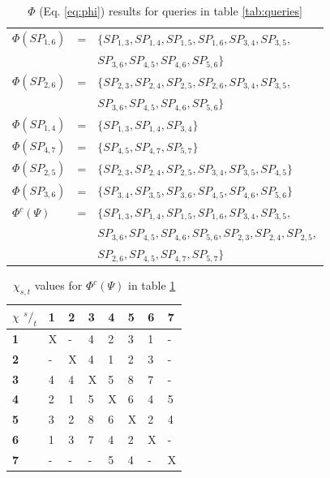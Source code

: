 \begin{table}
\begin{tabular}{lcp{}}
$\Phi(SP_{1,6})$ &= 	& $\{SP_{1,3},SP_{1,4},SP_{1,5},SP_{1,6},SP_{3,4},SP_{3,5},$\\
		 &	& $SP_{3,6},SP_{4,5},SP_{4,6},SP_{5,6}\}$ \\
$\Phi(SP_{2,6})$ &=  	& $\{SP_{2,3},SP_{2,4},SP_{2,5},SP_{2,6},SP_{3,4},SP_{3,5},$ \\
		 &	& $SP_{3,6},SP_{4,5},SP_{4,6},SP_{5,6}\}$ \\
$\Phi(SP_{1,4})$ &=  	& $\{SP_{1,3},SP_{1,4},SP_{3,4}\}$ \\
$\Phi(SP_{4,7})$ &=  	& $\{SP_{4,5},SP_{4,7},SP_{5,7}\}$ \\
$\Phi(SP_{2,5})$ &=  	& $\{SP_{2,3},SP_{2,4},SP_{2,5},SP_{3,4},SP_{3,5},SP_{4,5}\}$ \\
$\Phi(SP_{3,6})$ &=  	& $\{SP_{3,4},SP_{3,5},SP_{3,6},SP_{4,5},SP_{4,6},SP_{5,6}\}$ \\\hline
$\Phi^c(\Psi)$ 	 &=  	& $\{SP_{1,3},SP_{1,4},SP_{1,5},SP_{1,6},SP_{3,4},SP_{3,5},$ \\
		 &	& $SP_{3,6},SP_{4,5},SP_{4,6},SP_{5,6},SP_{2,3},SP_{2,4},SP_{2,5},$ \\
		 &	& $SP_{2,6},SP_{4,5},SP_{4,7},SP_{5,7}\}$  \\
\end{tabular}
\caption{$\Phi$ (Eq. \ref{eq:phi}) results for queries in table \ref{tab:queries}}
\label{tab:chi}
\end{table}

\begin{table}
\center
\begin{tabular}{|l||l|l|l|l|l|l|l|}
\textbf{$\chi$ ${^s/_t}$}& \bf1	& \bf2	& \bf3	& \bf4	& \bf5	& \bf6	& \bf7 \\\hline
\textbf{1}	& X	& -	& 4	& 2	& 3	& 1	& -	 \\
\textbf{2}	& -	& X	& 4	& 1	& 2	& 3	& -	 \\
\textbf{3}	& 4	& 4	& X	& 5	& 8	& 7	& -	 \\
\textbf{4}	& 2	& 1	& 5	& X	& 6	& 4	& 5	 \\
\textbf{5}	& 3	& 2	& 8	& 6	& X	& 2	& 4	 \\
\textbf{6}	& 1	& 3	& 7	& 4	& 2	& X	& -	 \\
\textbf{7}	& -	& -	& -	& 5	& 4	& -	& X	 \\
\end{tabular}
\caption{$\chi_{s,t}$ values for $\Phi^c(\Psi)$ in table \ref{tab:chi}}
\label{tab:freq}
\end{table}



